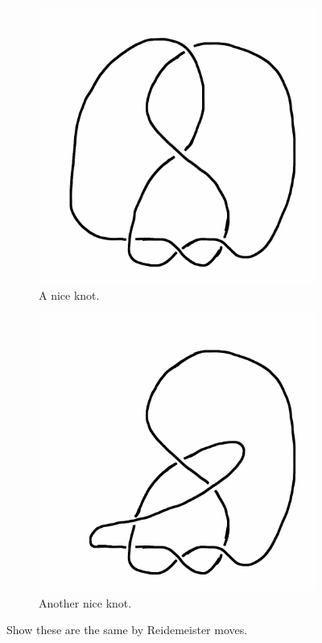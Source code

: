 \documentclass[12pt,letterpaper]{article}
\theoremstyle{definition}
\begin{document}
\begin{figure}[h]
    \centering
    \begin{subfigure}{.4\textwidth}
        \centering
        \includegraphics[width=\textwidth]{knotpics/exercise2-1.png}
        \caption{A nice knot.}
    \end{subfigure}
    \hspace{2cm}
    \begin{subfigure}{.4\textwidth}
        \centering
        \includegraphics[width=\textwidth]{knotpics/exercise2-2.png}
        \caption{Another nice knot.}
    \end{subfigure}
    \caption{Show these are the same by Reidemeister moves.}
\end{figure}
\end{document}
